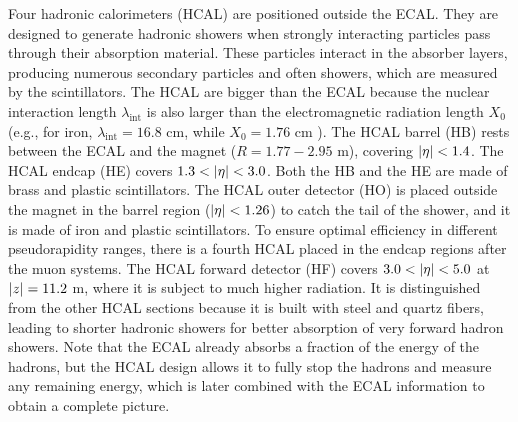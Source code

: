 Four hadronic calorimeters (HCAL) are positioned outside the ECAL. They are designed to generate hadronic showers when strongly interacting particles pass through their absorption material. These particles interact in the absorber layers, producing numerous secondary particles and often showers, which are measured by the scintillators. The HCAL are bigger than the ECAL because the nuclear interaction length $\lambda_\text{int}$ is also larger than the electromagnetic radiation length $X_0$ (e.g., for iron, $\lambda_\text{int}=16.8$ cm, while $X_0=1.76$ cm \cite{Buckley:2021fcn}). The HCAL barrel (HB) rests between the ECAL and the magnet ($R=1.77-2.95$ m), covering $\left\lvert\eta\right\rvert < 1.4$. The HCAL endcap (HE) covers $1.3 < \left\lvert\eta\right\rvert < 3.0$. Both the HB and the HE are made of brass and plastic scintillators. The HCAL outer detector (HO) is placed outside the magnet in the barrel region ($\left\lvert\eta\right\rvert < 1.26$) to catch the tail of the shower, and it is made of iron and plastic scintillators. To ensure optimal efficiency in different pseudorapidity ranges, there is a fourth HCAL placed in the endcap regions after the muon systems. The HCAL forward detector (HF) covers $3.0 < \left\lvert\eta\right\rvert < 5.0$ at $\left\lvert z\right\rvert = 11.2$ m, where it is subject to much higher radiation. It is distinguished from the other HCAL sections because it is built with steel and quartz fibers, leading to shorter hadronic showers for better absorption of very forward hadron showers. Note that the ECAL already absorbs a fraction of the energy of the hadrons, but the HCAL design allows it to fully stop the hadrons and measure any remaining energy, which is later combined with the ECAL information to obtain a complete picture.

